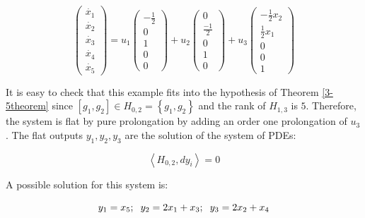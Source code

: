\documentclass[10pt]{article}
\newcommand{\3}{\mathbf{3}}
\newcommand{\2}{\mathbf{2}}
\newcommand{\1}{\mathbf{1}}
\newcommand{\0}{\mathbf{0}}
\begin{document}
\begin{equation*}
    \begin{pmatrix} \dot{x_1} \\ \dot{x_2}  \\ \dot{x_3}  \\ \dot{x_4}  \\ \dot{x_5}  \end{pmatrix}
        =
    u_1\begin{pmatrix} -\frac{1}{2} \\ 0 \\ 1 \\ 0 \\ 0  \end{pmatrix}
    +u_2\begin{pmatrix} 0 \\ \frac{-1}{2} \\ 0 \\ 1 \\ 0 \end{pmatrix}
    +u_3\begin{pmatrix} -\frac{1}{2}x_2\\ \frac{1}{2}x_1  \\ 0 \\ 0 \\1  \end{pmatrix}
\end {equation*}


It is easy to check that this example fits into the hypothesis of Theorem \ref{3-5theorem} since $[g_1,g_2] \in H_{0,2}=\left\{ g_{1}, g_{2}\right\}$ and the rank of $H_{1,3}$ is $5$. Therefore, the system is flat by pure prolongation by adding an order one prolongation of $u_3$. The flat outputs $y_1,y_2,y_3$ are the solution of the system of PDEs:

\[ \left< H_{0,2},  dy_{i} \right>= 0 \]

A possible solution for this system is:

\begin{equation*}
    y_1=x_5; \hspace{0.2cm} y_2=2x_1+x_3;\hspace{0.2cm} y_3=2x_2+x_4
\end{equation*}
\end{document}
